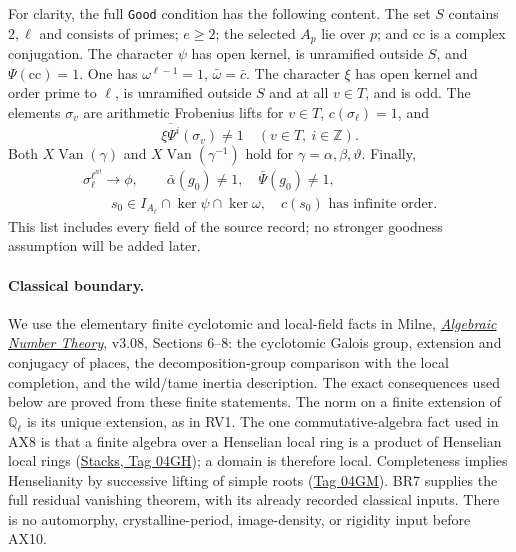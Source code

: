 For clarity, the full \texttt{Good} condition has the following
content.  The set $S$ contains $2,\ell$ and consists of primes;
$e\ge2$; the selected $A_p$ lie over $p$; and $\mathrm{cc}$ is a
complex conjugation.  The character $\psi$ has open kernel, is
unramified outside $S$, and $\Psi(\mathrm{cc})=1$.
One has $\omega^{\ell-1}=1$, $\bar\omega=\bar c$.
The character $\xi$ has open kernel and order prime to $\ell$,
is unramified outside $S$ and at all $v\in T$, and is odd.
The elements $\sigma_v$ are arithmetic Frobenius lifts for $v\in T$,
$c(\sigma_\ell)=1$, and
\[
 \overline{\xi\Psi^i}(\sigma_v)\ne1
       \quad(v\in T,\ i\in\mathbb Z).
 \tag{AX.7}
\]
Both $X\!\operatorname{Van}(\gamma)$ and
$X\!\operatorname{Van}(\gamma^{-1})$ hold for
$\gamma=\alpha,\beta,\vartheta$.  Finally,
\[
 \begin{gathered}
 \sigma_\ell^{\ell^{n!}}\longrightarrow\phi,
 \qquad\bar\alpha(g_0)\ne1,\quad\bar\Psi(g_0)\ne1,\\
 \qquad s_0\in I_{A_\ell}\cap\ker\psi\cap\ker\omega,
 \quad c(s_0)\text{ has infinite order}.
 \end{gathered}
 \tag{AX.8}
\]
This list includes every field of the source record; no stronger
goodness assumption will be added later.

\paragraph{Classical boundary.}
We use the elementary finite cyclotomic and local-field facts in
Milne, \href{https://www.jmilne.org/math/CourseNotes/ANT.pdf}
{\emph{Algebraic Number Theory}}, v3.08, Sections 6--8: the
cyclotomic Galois group, extension and conjugacy of places, the
decomposition-group comparison with the local completion, and the
wild/tame inertia description.  The exact consequences used below
are proved from these finite statements.  The norm on a finite
extension of $\mathbb Q_\ell$ is its unique extension, as in RV1.
The one commutative-algebra fact used in AX8 is that a finite algebra
over a Henselian local ring is a product of Henselian local rings
(\href{https://stacks.math.columbia.edu/tag/04GH}{Stacks, Tag 04GH});
a domain is therefore local.  Completeness implies Henselianity by
successive lifting of simple roots
(\href{https://stacks.math.columbia.edu/tag/04GM}{Tag 04GM}).
BR7 supplies the full
residual vanishing theorem, with its already recorded classical
inputs.  There is no automorphy, crystalline-period, image-density,
or rigidity input before AX10.

